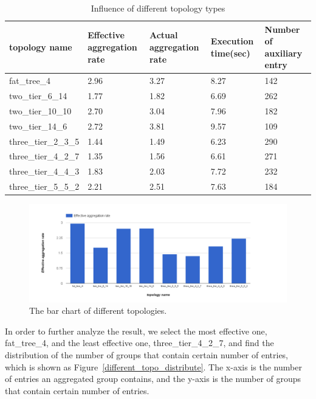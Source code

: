 \begin{table}
\centering
\caption{Influence of different topology types}
\begin{tabular}{|l|p{2.5cm}|p{2.5cm}|p{1.9cm}|p{2.8cm}|}
\hline topology name & Effective aggregation rate & Actual aggregation rate & Execution time(sec) & Number of auxiliary entry \\
\hline fat\_tree\_4 & 2.96 & 3.27 & 8.27 & 142 \\
\hline two\_tier\_6\_14 & 1.77 & 1.82 & 6.69 & 262 \\ 
\hline two\_tier\_10\_10 & 2.70 & 3.04 & 7.96 & 182 \\
\hline two\_tier\_14\_6 & 2.72 & 3.81 & 9.57 & 109 \\ 
\hline three\_tier\_2\_3\_5 & 1.44 & 1.49 & 6.23 & 290 \\
\hline three\_tier\_4\_2\_7 & 1.35 & 1.56 & 6.61 & 271 \\
\hline three\_tier\_4\_4\_3 & 1.83 & 2.03 & 7.72 & 232 \\
\hline three\_tier\_5\_5\_2 & 2.21 & 2.51 & 7.63 & 184 \\
\hline
\end{tabular}
\label{table:different_topo_type}
\end{table}

\begin{figure}[H]
\begin{center} 
\includegraphics[width=1.4\linewidth]{figures/exp_topotype_bar.png}
\end{center}
\caption{The bar chart of different topologies.}
\label{different_topo_bar}
\end{figure}

In order to further analyze the result, we select the most effective one, fat\_tree\_4, and the least effective one, three\_tier\_4\_2\_7, and find the distribution of the number of groups that contain certain number of entries, which is shown as Figure~\ref{different_topo_distribute}. The x-axis is the number of entries an aggregated group contains, and the y-axis is the number of groups that contain certain number of entries.


